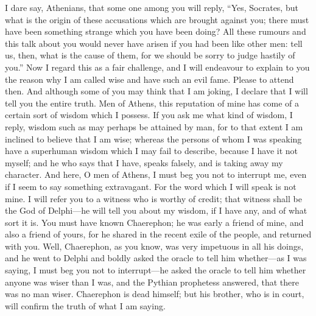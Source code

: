 \documentclass[11pt,letter]{article}
\begin{document}
\par  I dare say, Athenians, that some one among you will reply, “Yes, Socrates, but what is the origin of these accusations which are brought against you; there must have been something strange which you have been doing? All these rumours and this talk about you would never have arisen if you had been like other men: tell us, then, what is the cause of them, for we should be sorry to judge hastily of you.” Now I regard this as a fair challenge, and I will endeavour to explain to you the reason why I am called wise and have such an evil fame. Please to attend then. And although some of you may think that I am joking, I declare that I will tell you the entire truth. Men of Athens, this reputation of mine has come of a certain sort of wisdom which I possess. If you ask me what kind of wisdom, I reply, wisdom such as may perhaps be attained by man, for to that extent I am inclined to believe that I am wise; whereas the persons of whom I was speaking have a superhuman wisdom which I may fail to describe, because I have it not myself; and he who says that I have, speaks falsely, and is taking away my character. And here, O men of Athens, I must beg you not to interrupt me, even if I seem to say something extravagant. For the word which I will speak is not mine. I will refer you to a witness who is worthy of credit; that witness shall be the God of Delphi—he will tell you about my wisdom, if I have any, and of what sort it is. You must have known Chaerephon; he was early a friend of mine, and also a friend of yours, for he shared in the recent exile of the people, and returned with you. Well, Chaerephon, as you know, was very impetuous in all his doings, and he went to Delphi and boldly asked the oracle to tell him whether—as I was saying, I must beg you not to interrupt—he asked the oracle to tell him whether anyone was wiser than I was, and the Pythian prophetess answered, that there was no man wiser. Chaerephon is dead himself; but his brother, who is in court, will confirm the truth of what I am saying.
\end{document}

